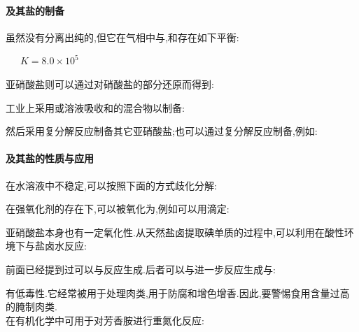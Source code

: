 \documentclass{ctexart}
\begin{document}
\paragraph{及其盐的制备}
虽然没有分离出纯的,但它在气相中与,和存在如下平衡:
\begin{center}
    \ \ \ $K=8.0\times10^5$
\end{center}
亚硝酸盐则可以通过对硝酸盐的部分还原而得到:
\begin{center}
\end{center}
工业上采用或溶液吸收和的混合物以制备:
\begin{center}
\end{center}
然后采用复分解反应制备其它亚硝酸盐;也可以通过复分解反应制备,例如:
\begin{center}
\end{center}
\paragraph{及其盐的性质与应用}
在水溶液中不稳定,可以按照下面的方式歧化分解:
\begin{center}
\end{center}
在强氧化剂的存在下,可以被氧化为,例如可以用滴定:
\begin{center}
\end{center}
亚硝酸盐本身也有一定氧化性.从天然盐卤提取碘单质的过程中,可以利用在酸性环境下与盐卤水反应:
\begin{center}
\end{center}
前面已经提到过可以与反应生成.后者可以与进一步反应生成与:
\begin{center}
\end{center}
\indent {}有低毒性.它经常被用于处理肉类,用于防腐和增色增香.因此,要警惕食用含量过高的腌制肉类.\\
\indent {}在有机化学中可用于对芳香胺进行重氮化反应:
\begin{center}
\end{center}
\end{document}
